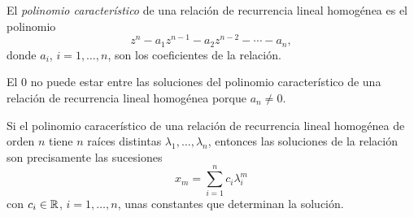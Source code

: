 \begin{definition}
    El \emph{polinomio característico} de 
    una relación de recurrencia lineal homogénea
    es el polinomio
    \begin{equation*}
        z^n - a_1z^{n-1} - a_2z^{n-2} - \cdots - a_n,
    \end{equation*}
    donde $a_i$, $i = 1,\ldots,n$, son los coeficientes de la relación.
\end{definition}

\begin{remark}
    El $0$ no puede estar entre las soluciones del polinomio característico de
    una relación de recurrencia lineal homogénea porque $a_n \ne 0$.
\end{remark}

\begin{proposition}
    Si el polinomio caracerístico de
    una relación de recurrencia lineal homogénea de orden $n$
    tiene $n$ raíces distintas $\lambda_1,\ldots,\lambda_n$,
    entonces las soluciones de la relación son precisamente las sucesiones
    \begin{equation*}
        x_m = \sum_{i=1}^n c_i\lambda_i^m
    \end{equation*}
    con $c_i \in \mathbb{R}$, $i = 1,\ldots,n$,
    unas constantes que determinan la solución.
\end{proposition}



